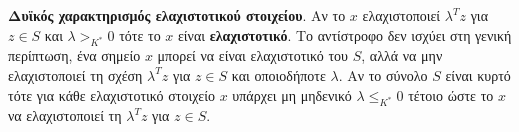 \textbf{Δυϊκός χαρακτηρισμός ελαχιστοτικού στοιχείου}. Αν το $x$ ελαχιστοποιεί
$\lambda^Tz$ για $z\in S$ και $\lambda >_{K^*} 0$ τότε το $x$ είναι
\textbf{ελαχιστοτικό}. Το αντίστροφο δεν ισχύει στη γενική περίπτωση, ένα σημείο
$x$ μπορεί να είναι ελαχιστοτικό του $S$, αλλά να μην ελαχιστοποιεί τη σχέση
$\lambda^Tz$ για $z\in S$ και οποιοδήποτε $\lambda$. Αν το σύνολο $S$
είναι κυρτό τότε για κάθε ελαχιστοτικό στοιχείο $x$ υπάρχει μη μηδενικό
$\lambda \leq_{K^*} 0$ τέτοιο ώστε το $x$ να ελαχιστοποιεί τη $\lambda^Tz$ για
$z\in S$.
